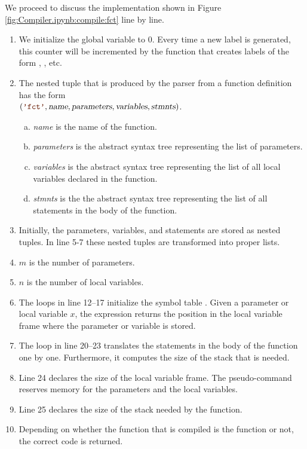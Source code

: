 We proceed to discuss the implementation shown in Figure \ref{fig:Compiler.ipynb:compile:fct} line by line.
\begin{enumerate}
\item We initialize the global variable  to $0$.
      Every time a new label is generated, this counter will be incremented by the function 
      that creates labels of the form , , etc.
\item The nested tuple that is produced by the parser from a function definition has the form
      \\[0.2cm]
      \hspace*{1.3cm}
      $(\mytt{'fct'}, \textsl{name}, \textsl{parameters}, \textsl{variables}, \textsl{stmnts})$.
      \begin{enumerate}[(a)]
      \item \textsl{name} is the name of the function.
      \item \textsl{parameters} is the abstract syntax tree representing the list of parameters.
      \item \textsl{variables} is the abstract syntax tree representing the list of all local variables
            declared in the function. 
      \item \textsl{stmnts} is the the abstract syntax tree representing the list of all statements in the body
            of the function. 
      \end{enumerate}
\item Initially, the parameters, variables, and statements are stored as nested tuples.
      In line 5-7 these nested tuples are transformed into proper lists.
\item $m$ is the number of parameters. 
\item $n$ is the number of local variables. 
\item The  loops in line 12--17 initialize the symbol table .
      Given a parameter or local variable $x$, the expression 
      returns the position in the local variable frame where the parameter or variable is stored.
\item The  loop in line 20--23 translates the statements in the body of the function one by one.
  Furthermore, it computes the size of the stack that is needed.
\item Line 24 declares the size of the local variable frame.  The pseudo-command 
  reserves memory for the parameters and the local variables.
\item Line 25 declares the size of the stack needed by the function.
\item Depending on whether the function that is compiled is the function  or not,
  the correct code is returned.
\end{enumerate}

